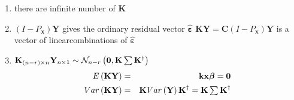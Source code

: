 \documentclass{article}
\begin{document}
\begin{enumerate}
\item there are infinite number of $\mathbf{K}$

\item $\left( I-P_{\mathbf{x}}\right) \mathbf{Y}$ gives the ordinary
residual vector $\mathbf{\hat{\varepsilon}}$\newline
$\mathbf{KY}=\mathbf{C}\left( I-P_{\mathbf{x}}\right) \mathbf{Y}$ is a
vector of linearcombinations of $\mathbf{\hat{\varepsilon}}$

\item $\mathbf{K}_{\left( n-r\right) \times n}\mathbf{Y}_{n\times 1}\sim 
\mathcal{N}_{n-r}\left( \mathbf{0},\mathbf{K}\mathop{\textstyle \sum } \mathbf{K}^{\dagger
}\right) $%
\begin{eqnarray*}
E\left( \mathbf{KY}\right) &=&\mathbf{kx\beta }=\mathbf{0} \\
Var\left( \mathbf{KY}\right) &=&\mathbf{K}Var\left( \mathbf{Y}\right) 
\mathbf{K}^{\dagger }=\mathbf{K}\tsum \mathbf{K}^{\dagger }
\end{eqnarray*}
\end{enumerate}

\bigskip
\end{document}
